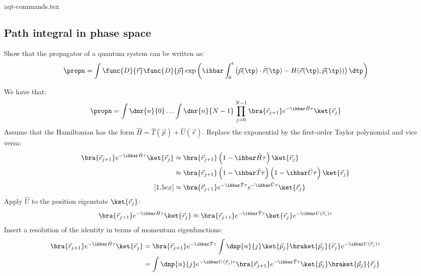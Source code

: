 {aqt-commands.tex}
\subsection{Path integral in phase space}

Show that the propagator of a quantum system can be written as:
\begin{equation}
  \label{result}
  \propn = \int\func{D}{\vec{r}}\func{D}{\vec{p}}\exp\left(
  \ihbar\int_{0}^{t}\left(
  \vec{p}(\tp) \cdot \dot{\vec{r}}(\tp) - H(\vec{r}(\tp), \vec{p}(\tp))
  \right)\dtp
  \right)
\end{equation}

We have that:
\begin{equation}
  \label{start}
  \propn = \int\dnr{n}{0}\ldots\int\dnr{n}{N - 1}
  \prod_{j = 0}^{N - 1} \bra{\vec{r}_{j + 1}} e^{-\ihbar \hat{H}\tau} \ket{\vec{r}_j}
\end{equation}
Assume that the Hamiltonian has the form $\hat{H} = \hat{T}(\vec{p}) +
  \hat{U}(\vec{r})$.
Replace the exponential by the first-order Taylor polynomial and vice versa:
\begin{align*}
  \bra{\vec{r}_{j + 1}}
  e^{-\ihbar\hat{H}\tau}
  \ket{\vec{r}_j}
   & \approx
  \bra{\vec{r}_{j + 1}}
  \left(1 - \ihbar\hat{H}\tau\right)
  \ket{\vec{r}_j}
  \\
   & \approx
  \bra{\vec{r}_{j + 1}}
  \left(1 - \ihbar\hat{T}\tau\right)
  \left(1 - \ihbar\hat{U}\tau\right)
  \ket{\vec{r}_j}
  \\
  [1.5ex]
   & \approx
  \bra{\vec{r}_{j + 1}}
  e^{-\ihbar \hat{T}\tau} e^{-\ihbar \hat{U}\tau}
  \ket{\vec{r}_j}
\end{align*}
Apply $\hat{U}$ to the position eigenstate $\ket{\vec{r}_j}$:
\begin{equation*}
  \bra{\vec{r}_{j + 1}}
  e^{-\ihbar\hat{H}\tau}
  \ket{\vec{r}_j}
  \approx \bra{\vec{r}_{j + 1}}
  e^{-\ihbar \hat{T}\tau}
  \ket{\vec{r}_j}
  e^{-\ihbar U(\vec{r}_j)\tau}
\end{equation*}
Insert a resolution of the identity in terms of momentum eigenfunctions:
\begin{align*}
  \bra{\vec{r}_{j + 1}}
  e^{-\ihbar \hat{H}\tau}
  \ket{\vec{r}_j}
   & =
  \bra{\vec{r}_{j + 1}}
  e^{-\ihbar \hat{T}\tau}
  \int\dnp{n}{j}
  \ket{\vec{p}_j}
  \braket{\vec{p}_j}{\vec{r}_j}
  e^{-\ihbar U(\vec{r}_j)\tau}
  \\
   & =
  \int\dnp{n}{j}
  e^{-\ihbar U(\vec{r}_j)\tau}
  \bra{\vec{r}_{j + 1}}
  e^{-\ihbar \hat{T}\tau}
  \ket{\vec{p}_j}
  \braket{\vec{p}_j}{\vec{r}_j}
\end{align*}
